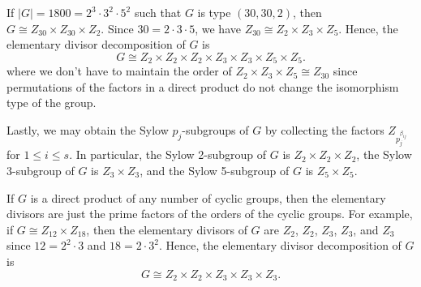 \begin{ex}
    If $|G| = 1800 = 2^3 \cdot 3^2 \cdot 5^2$ such that $G$ is type $(30, 30, 2)$, then $G \cong Z_{30} \times Z_{30} \times Z_2$. Since $30 = 2 \cdot 3 \cdot 5$, we have $Z_{30} \cong Z_2 \times Z_3 \times Z_5$. Hence, the elementary divisor decomposition of $G$ is
    \[G \cong Z_2 \times Z_2 \times Z_2 \times Z_3 \times Z_3 \times Z_5 \times Z_5.\]
    where we don't have to maintain the order of $Z_2 \times Z_3 \times Z_5 \cong Z_{30}$ since permutations of the factors in a direct product do not change the isomorphism type of the group.

    Lastly, we may obtain the Sylow $p_j$-subgroups of $G$ by collecting the factors $Z_{p_j^{\beta_{ij}}}$ for $1 \leq i \leq s$. In particular, the Sylow 2-subgroup of $G$ is $Z_2 \times Z_2 \times Z_2$, the Sylow 3-subgroup of $G$ is $Z_3 \times Z_3$, and the Sylow 5-subgroup of $G$ is $Z_5 \times Z_5$.
\end{ex}

\begin{ex}
    If $G$ is a direct product of any number of cyclic groups, then the elementary divisors are just the prime factors of the orders of the cyclic groups. For example, if $G \cong Z_{12} \times Z_{18}$, then the elementary divisors of $G$ are $Z_2$, $Z_2$, $Z_3$, $Z_3$, and $Z_3$ since $12 = 2^2 \cdot 3$ and $18 = 2 \cdot 3^2$. Hence, the elementary divisor decomposition of $G$ is
    \[G \cong Z_2 \times Z_2 \times Z_3 \times Z_3 \times Z_3.\]
\end{ex}

